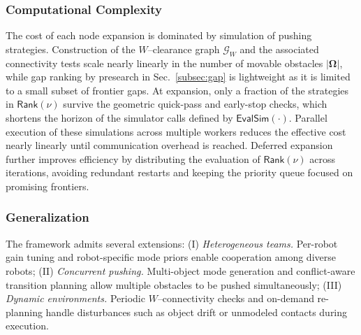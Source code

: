 \subsubsection{Computational Complexity}\label{subsubsec:complexity}
The cost of each node expansion is dominated by simulation of pushing
strategies. Construction of the $W$--clearance graph $\mathcal{G}_W$ and the
associated connectivity tests scale nearly linearly in the number of movable
obstacles $|\boldsymbol{\Omega}|$, while gap ranking by presearch
in Sec.~\ref{subsec:gap} is lightweight as it is limited to a small subset
of frontier gaps. At expansion, only a fraction of the strategies in
$\mathsf{Rank}(\nu)$ survive the geometric quick-pass and early-stop checks,
which shortens the horizon of the simulator calls defined by
$\mathsf{EvalSim}(\cdot)$. Parallel execution of these simulations across multiple
workers reduces the effective cost nearly linearly until communication overhead
is reached. Deferred expansion further improves efficiency by distributing the
evaluation of $\mathsf{Rank}(\nu)$ across iterations, avoiding redundant
restarts and keeping the priority queue focused on promising frontiers.


\subsubsection{Generalization}\label{subsec:general}
The framework admits several extensions: 
(I) \textit{Heterogeneous teams.} Per-robot gain tuning and robot-specific mode 
priors enable cooperation among diverse robots; 
(II) \textit{Concurrent pushing.} Multi-object mode generation and conflict-aware 
transition planning allow multiple obstacles to be pushed simultaneously; 
(III) \textit{Dynamic environments.} Periodic $W$--connectivity checks and 
on-demand re-planning handle disturbances such as object drift or unmodeled 
contacts during execution.

